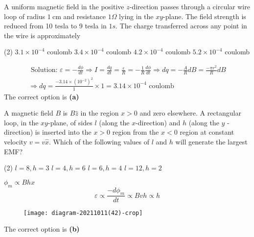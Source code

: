 \begin{enumerate}
\begin{minipage}{\textwidth}
	\item A uniform magnetic field in the positive $z$-direction passes through a circular wire loop of radius $1 \mathrm{~cm}$ and resistance $1 \Omega$ lying in the $x y$-plane. The field strength is reduced from 10 tesla to 9 tesla in $1 s$. The charge transferred across any point in the wire is approximately
\end{minipage}
\begin{tasks}(2)
	\task[\textbf{A.}]$3.1 \times 10^{-4}$ coulomb
	\task[\textbf{B.}] $3.4 \times 10^{-4}$ coulomb
	\task[\textbf{C.}] $4.2 \times 10^{-4}$ coulomb
	\task[\textbf{D.}]$5.2 \times 10^{-4}$ coulomb
\end{tasks}
\begin{answer}
	$$
	\begin{gathered}
	\text { Solution: } \varepsilon=-\frac{d \phi}{d t} \Rightarrow I=\frac{d q}{d t}=\frac{\varepsilon}{R}=-\frac{1}{R} \frac{d \phi}{d t} \Rightarrow d q=-\frac{A}{R} d B=\frac{-\pi r^{2}}{R} d B \\
	\Rightarrow d q=\frac{-3.14 \times\left(10^{-2}\right)^{2}}{1} \times 1=3.14 \times 10^{-4} \text { coulomb }
	\end{gathered}
	$$
	The correct option is \textbf{(a)}	
\end{answer}
\begin{minipage}{\textwidth}
	\item A magnetic field $B$ is $B \hat{z}$ in the region $x>0$ and zero elsewhere. A rectangular loop, in the $x y$-plane, of sides $l$ (along the $x$-direction) and $h$ (along the $y$ - direction) is inserted into the $x>0$ region from the $x<0$ region at constant velocity $v=v \hat{x}$. Which of the following values of $l$ and $h$ will generate the largest EMF?
\end{minipage}
\begin{tasks}(2)
	\task[\textbf{A.}] $l=8, h=3$
	\task[\textbf{B.}]$l=4, h=6$
	\task[\textbf{C.}]$l=6, h=4$
	\task[\textbf{D.}]$l=12, h=2$
\end{tasks}
\begin{answer}
	$\phi_{m} \propto B h x$
	$$
	\varepsilon \propto \frac{-d \phi_{m}}{d t} \propto B v h \propto h
	$$
	\begin{figure}[H]
		\centering
		\texttt{[image: diagram-20211011(42)-crop]}
	\end{figure}
	The correct option is \textbf{(b)}	
\end{answer}
\end{enumerate}